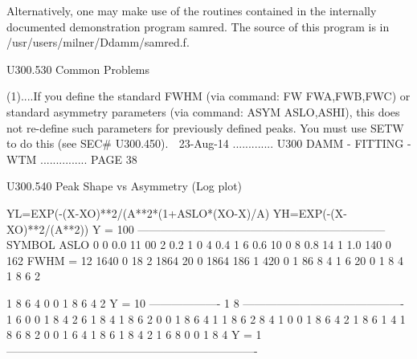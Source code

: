    Alternatively,   one  may  make  use  of  the  routines  contained  in  the
   internally documented demonstration program  samred.  The  source  of  this
   program is in /usr/users/milner/Ddamm/samred.f.
 
   U300.530  Common Problems
 
   (1)....If  you  define  the  standard FWHM (via command: FW FWA,FWB,FWC) or
          standard asymmetry parameters (via command:  ASYM  ASLO,ASHI),  this
          does  not  re-define  such  parameters for previously defined peaks.
          You must use SETW to do this (see SEC# U300.450).
    
   23-Aug-14 ............. U300  DAMM - FITTING - WTM ............... PAGE  38
 
   U300.540  Peak Shape vs Asymmetry (Log plot)
 
            YL=EXP(-(X-XO)**2/(A**2*(1+ASLO*(XO-X)/A)
            YH=EXP(-(X-XO)**2/(A**2))
   Y = 100  ------------------------------------------------------------------
            SYMBOL  ASLO                            0
                 0   0.0                          11 00
                 2   0.2                         1     0
                 4   0.4                        1
                 6   0.6                       10       0
                 8   0.8                      14
                 1   1.0                     140         0
                                            162
              FWHM = 12                    1640           0
                                          18 2
                                         1864
                                            20             0
                                        1864
                                       186
                                      1   420               0
                                     1 86
                                      8  4
                                    1  6  20                 0
                                   1 8  4
                                  1 8 6  2
 
                                 1 8 6 4  0                   0
                                1
                                  8 6 4 2
   Y = 10  ------------------- 1 8 -------------------------------------------
                              1    6     0                     0
                             1  8    4 2
                                  6
                            1  8    4
                           1  8  6    2
                                        0                       0
                          1  8  6  4
                         1
                        1   8  6     2
                           8      4
                       1               0                         0
                      1   8   6  4
                                    2
                     1   8   6
                    1           4
                   1    8   6
                       8           2  0                           0
                  1        6   4
                 1    8
                          6
                1    8        4   2
               1         6
                    8                0                             0
              1    8         4
   Y = 1   -------------------------------------------------------------------
 

